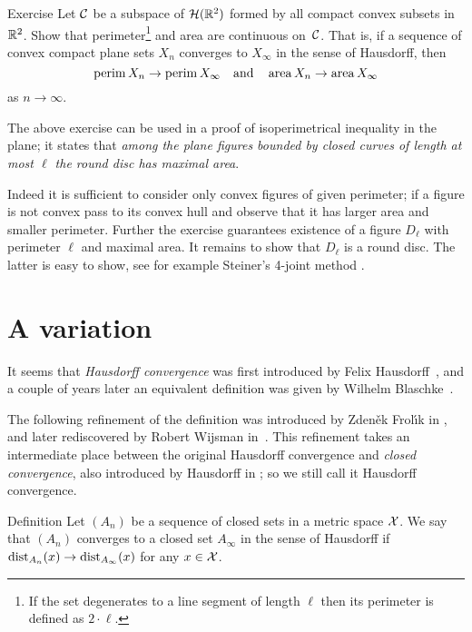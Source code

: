 \begin{thm}{Exercise}\label{ex:Huas-perimeter-area}
Let $\mathcal{C}$ be a subspace of $\mathcal{H}(\mathbb{R}^2)$ formed by all compact convex subsets in $\mathbb{R}^2$.
Show that perimeter\footnote{If the set degenerates to a line segment of length $\ell$ then its perimeter is defined as $2\cdot \ell$.} and area are continuous on~$\mathcal{C}$.
That is, if a sequence of convex compact plane sets $X_n$ converges to $X_\infty$ in the sense of Hausdorff, then 
\[\operatorname{\rm perim}\nolimits X_n\to \operatorname{\rm perim}\nolimits X_\infty\quad\text{and}\quad\operatorname{\rm area}\nolimits X_n\to\operatorname{\rm area}\nolimits X_\infty\]
as $n\to\infty$.
\end{thm}

The above exercise can be used in a proof of isoperimetrical inequality in the plane;
it states that \emph{among the plane figures bounded by closed curves of length at most $\ell$ the round disc has maximal area}.

Indeed it is sufficient to consider only convex figures of given perimeter; if a figure is not convex pass to its convex hull and observe that it has larger area and smaller perimeter.
Further the exercise guarantees existence of a figure $D_\ell$ with perimeter $\ell$ and maximal area.
It remains to show that $D_\ell$ is a round disc.
The latter is easy to show, see for example Steiner's 4-joint method \cite{blaschke}.


\section{A variation}

It seems that \emph{Hausdorff convergence} was first introduced by Felix Hausdorff~\cite{hausdorff},
and a couple of years later an equivalent definition was given by Wilhelm Blaschke~\cite{blaschke}.

The following refinement of the definition was introduced by  Zden\v{e}k Frol\'{\i}k in \cite{frolik},
and later rediscovered by Robert Wijsman in~\cite{wijsman}.  
This refinement takes an intermediate place between the original Hausdorff convergence and {}\emph{closed convergence}, also introduced by Hausdorff in \cite{hausdorff};
so we still call it Hausdorff convergence.

\begin{thm}{Definition}\label{def:gen-Haus-conv}
Let $(A_n)$ be a sequence of closed sets in a metric space $\mathcal{X}$.
We say that $(A_n)$ converges to a closed set $A_\infty$ in the sense of Hausdorff if $\mathrm{dist}_{A_n}(x)\to \mathrm{dist}_{A_\infty}(x)$ for any $x\in\mathcal{X}$.
\end{thm}

